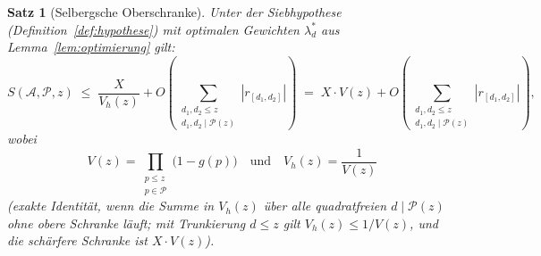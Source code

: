\documentclass[12pt,a4paper]{amsart}
\newtheorem{theorem}{Satz}[section]
\theoremstyle{definition}
\begin{document}
\begin{theorem}[Selbergsche Oberschranke]\label{thm:selberg_haupt}
  Unter der Siebhypothese (Definition~\ref{def:hypothese}) mit optimalen Gewichten
  $\lambda_d^*$ aus Lemma~\ref{lem:optimierung} gilt:
  \[
    S(\mathcal{A}, \mathcal{P}, z)
    \;\leq\; \frac{X}{V_h(z)}
             + O\!\left(\sum_{\substack{d_1, d_2 \leq z \\ d_1,d_2 \mid \mathcal{P}(z)}} |r_{[d_1,d_2]}|\right)
    \;=\; X \cdot V(z)
             + O\!\left(\sum_{\substack{d_1, d_2 \leq z \\ d_1,d_2 \mid \mathcal{P}(z)}} |r_{[d_1,d_2]}|\right),
  \]
  wobei
  \[
    V(z) = \prod_{\substack{p \leq z \\ p \in \mathcal{P}}} \bigl(1 - g(p)\bigr)
    \quad\text{und}\quad
    V_h(z) = \frac{1}{V(z)}
  \]
  (exakte Identität, wenn die Summe in $V_h(z)$ über alle quadratfreien
  $d \mid \mathcal{P}(z)$ ohne obere Schranke läuft; mit Trunkierung $d \leq z$
  gilt $V_h(z) \leq 1/V(z)$, und die schärfere Schranke ist $X \cdot V(z)$).
\end{theorem}
\end{document}
